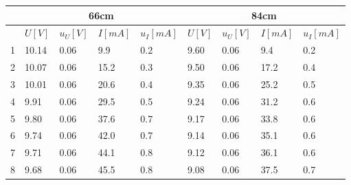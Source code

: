 \documentclass[12pt, a4paper]{article}
\begin{document}
\begin{table}[H]
	\begin{center}
	\begin{tabular}{|l|llll|llll|}
	\hline
	   & \multicolumn{4}{c|}{66cm}                                                                              & \multicolumn{4}{c|}{84cm}                                                                              \\ \hline
	   & \multicolumn{1}{l|}{$U[V]$} & \multicolumn{1}{l|}{$u_U[V]$} & \multicolumn{1}{l|}{$I[mA]$} & $u_I[mA]$ & \multicolumn{1}{l|}{$U[V]$} & \multicolumn{1}{l|}{$u_U[V]$} & \multicolumn{1}{l|}{$I[mA]$} & $u_I[mA]$ \\ \hline
	1  & \multicolumn{1}{l|}{10.14}  & \multicolumn{1}{l|}{0.06}     & \multicolumn{1}{l|}{9.9}     & 0.2       & \multicolumn{1}{l|}{9.60}   & \multicolumn{1}{l|}{0.06}     & \multicolumn{1}{l|}{9.4}     & 0.2       \\ \hline
	2  & \multicolumn{1}{l|}{10.07}  & \multicolumn{1}{l|}{0.06}     & \multicolumn{1}{l|}{15.2}    & 0.3       & \multicolumn{1}{l|}{9.50}   & \multicolumn{1}{l|}{0.06}     & \multicolumn{1}{l|}{17.2}    & 0.4       \\ \hline
	3  & \multicolumn{1}{l|}{10.01}  & \multicolumn{1}{l|}{0.06}     & \multicolumn{1}{l|}{20.6}    & 0.4       & \multicolumn{1}{l|}{9.35}   & \multicolumn{1}{l|}{0.06}     & \multicolumn{1}{l|}{25.2}    & 0.5       \\ \hline
	4  & \multicolumn{1}{l|}{9.91}   & \multicolumn{1}{l|}{0.06}     & \multicolumn{1}{l|}{29.5}    & 0.5       & \multicolumn{1}{l|}{9.24}   & \multicolumn{1}{l|}{0.06}     & \multicolumn{1}{l|}{31.2}    & 0.6       \\ \hline
	5  & \multicolumn{1}{l|}{9.80}   & \multicolumn{1}{l|}{0.06}     & \multicolumn{1}{l|}{37.6}    & 0.7       & \multicolumn{1}{l|}{9.17}   & \multicolumn{1}{l|}{0.06}     & \multicolumn{1}{l|}{33.8}    & 0.6       \\ \hline
	6  & \multicolumn{1}{l|}{9.74}   & \multicolumn{1}{l|}{0.06}     & \multicolumn{1}{l|}{42.0}    & 0.7       & \multicolumn{1}{l|}{9.14}   & \multicolumn{1}{l|}{0.06}     & \multicolumn{1}{l|}{35.1}    & 0.6       \\ \hline
	7  & \multicolumn{1}{l|}{9.71}   & \multicolumn{1}{l|}{0.06}     & \multicolumn{1}{l|}{44.1}    & 0.8       & \multicolumn{1}{l|}{9.12}   & \multicolumn{1}{l|}{0.06}     & \multicolumn{1}{l|}{36.1}    & 0.6       \\ \hline
	8  & \multicolumn{1}{l|}{9.68}   & \multicolumn{1}{l|}{0.06}     & \multicolumn{1}{l|}{45.5}    & 0.8       & \multicolumn{1}{l|}{9.08}   & \multicolumn{1}{l|}{0.06}     & \multicolumn{1}{l|}{37.5}    & 0.7       \\ \hline

\end{tabular}
\end{center}
\end{table}
\end{document}
